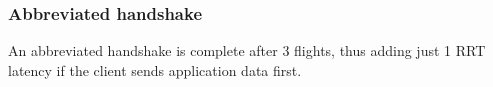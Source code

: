\subsubsection{Abbreviated handshake}

An abbreviated handshake is complete after 3 flights, thus adding just 1 RRT latency if the client sends application data first.








